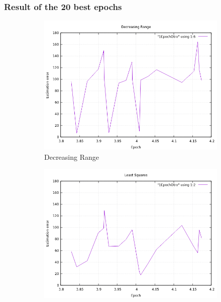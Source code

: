 \subsubsection{Result of the 20 best epochs}

\begin{figure}[!htb]
	\begin{subfigure}[b]{0.5\textwidth}
		\includegraphics[width=\linewidth]{images/resultsStellar/20Epochs1Epoch/1EpochOtroDR.png}
		\caption{Decreasing Range}
	\end{subfigure}
	\hfill
	\begin{subfigure}[b]{0.5\textwidth}
		\includegraphics[width=\linewidth]{images/resultsStellar/20Epochs1Epoch/1EpochOtroLS1.png}

\end{subfigure}
\end{figure}
